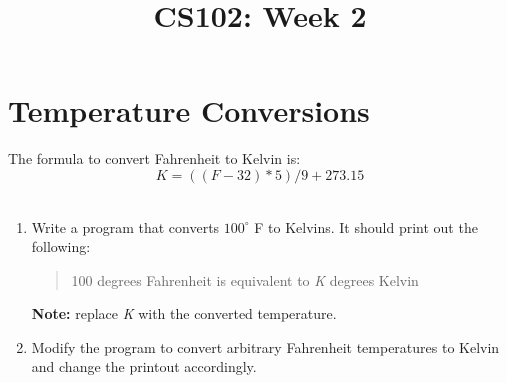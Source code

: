 \documentclass{article}
\begin{document}
\title{CS102: Week 2}

\maketitle

\section*{Temperature Conversions}
The formula to convert Fahrenheit to Kelvin is:	
\begin{equation}	
	K = ((F-32)*5)/9 + 273.15
\end{equation}
\\
\begin{enumerate}
\item Write a program that converts $100^{\circ}$ F to Kelvins. It should print out the following:
	\begin{quote}
	100 degrees Fahrenheit is equivalent to \textit{K} degrees Kelvin
	\end{quote}
	\textbf{Note:} replace \textit{K} with the converted temperature. 
\item Modify the program to convert arbitrary Fahrenheit temperatures to Kelvin and change the printout accordingly.
\end{enumerate}
\end{document}

